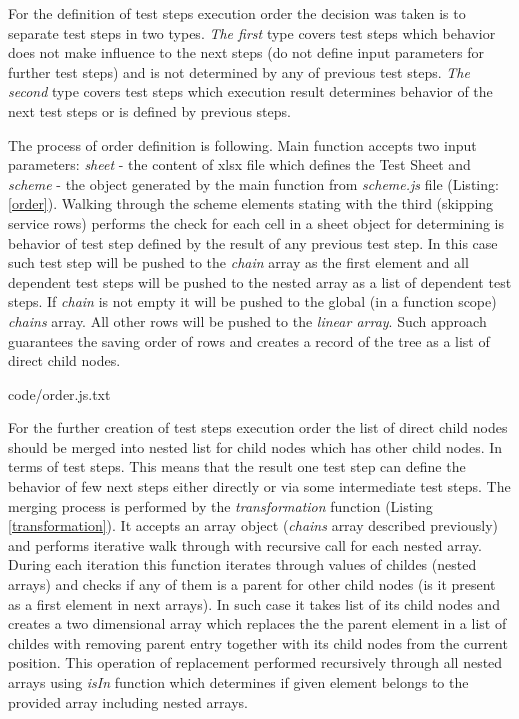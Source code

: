 For the definition of test steps execution order the decision was taken is to separate test steps in two types. \textit{The first} type covers test steps which behavior does not make influence to the next steps (do not define input parameters for further test steps) and is not determined by any of previous test steps. \textit{The second} type covers test steps which execution result determines behavior of the next test steps or is defined by previous steps.

%
The process of order definition is following. Main function accepts two input parameters: \textit{sheet} - the content of xlsx file which defines the Test Sheet and \textit{scheme} - the object generated by the main function from \textit{scheme.js} file (Listing: \ref{order}). Walking through the scheme elements stating with the third (skipping service rows) performs the check for each cell in a sheet object for determining is behavior of test step defined by the result of any previous test step. In this case such test step will be pushed to the \textit{chain} array as the first element and all dependent test steps will be pushed to the nested array as a list of dependent test steps. If \textit{chain} is not empty it will be pushed to the global (in a function scope) \textit{chains}  array. All other rows will be pushed to the \textit{linear array}. Such approach guarantees the saving order of rows and creates a record of the tree as a list of direct child nodes.



{code/order.js.txt}

For the further creation of test steps execution order the list of direct child nodes should be merged into nested list for child nodes which has other child nodes. In terms of test steps. This means that the result one test step can define the behavior of few next steps either directly or via some intermediate test steps. 
The merging process is performed by the \textit{transformation} function (Listing \ref{transformation}). It accepts an array object (\textit{chains} array described previously) and performs iterative walk through with recursive call for each nested array. During each iteration this function iterates through values of childes (nested arrays) and checks if any of them is a parent for other child nodes (is it present as a first element in next arrays). In such case it takes list of its child nodes and creates a two dimensional array which replaces the the parent element in a list of childes with removing parent entry together with its child nodes from the current position. This operation of replacement performed recursively through all nested arrays using \textit{isIn} function which determines if given element belongs to the provided array including nested arrays.

